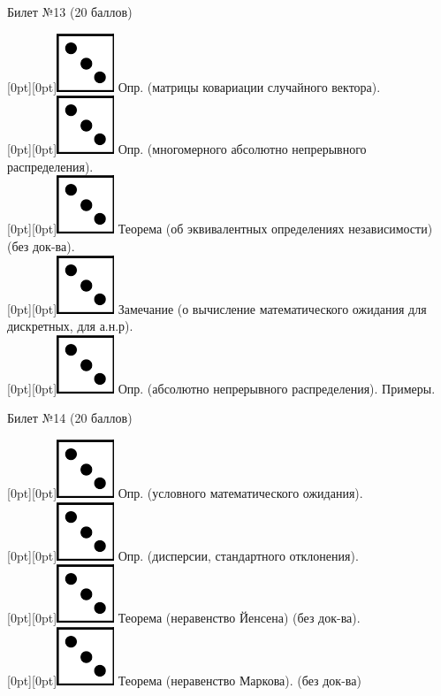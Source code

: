 \documentclass[10pt]{article}
\begin{document}
\begin{center} {\Large Билет №13 (20 баллов)} \end{center}
\raisebox{-1pt}[0pt][0pt]{\includegraphics[width=0.02\linewidth]{3.png}} Опр. (матрицы ковариации случайного вектора). \\
\raisebox{-1pt}[0pt][0pt]{\includegraphics[width=0.02\linewidth]{3.png}} Опр. (многомерного абсолютно непрерывного распределения). \\
\raisebox{-1pt}[0pt][0pt]{\includegraphics[width=0.02\linewidth]{3.png}} Теорема (об эквивалентных определениях независимости) (без док-ва). \\
\raisebox{-1pt}[0pt][0pt]{\includegraphics[width=0.02\linewidth]{3.png}} Замечание (о вычисление  математического ожидания для дискретных, для а.н.р). \\
\raisebox{-1pt}[0pt][0pt]{\includegraphics[width=0.02\linewidth]{3.png}} Опр. (абсолютно непрерывного распределения). Примеры. \\
\begin{center} {\Large Билет №14 (20 баллов)} \end{center}
\raisebox{-1pt}[0pt][0pt]{\includegraphics[width=0.02\linewidth]{3.png}} Опр. (условного математического ожидания). \\
\raisebox{-1pt}[0pt][0pt]{\includegraphics[width=0.02\linewidth]{3.png}} Опр. (дисперсии, стандартного отклонения). \\ 
\raisebox{-1pt}[0pt][0pt]{\includegraphics[width=0.02\linewidth]{3.png}} Теорема (неравенство Йенсена) (без док-ва). \\
\raisebox{-1pt}[0pt][0pt]{\includegraphics[width=0.02\linewidth]{3.png}} Теорема (неравенство Маркова). (без док-ва) \\
\end{document}
